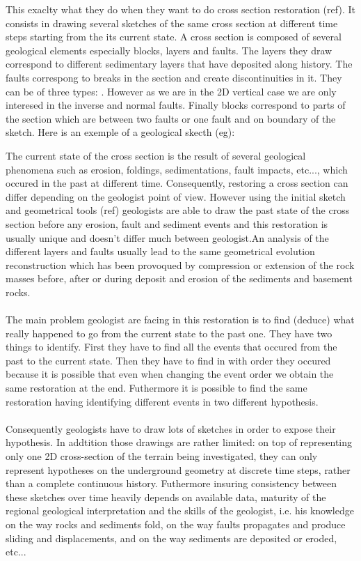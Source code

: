 \documentclass[12pt, a4paper]{memoir} %
\begin{document}
This exaclty what they do when they want to do cross section restoration (ref). It consists in drawing several sketches of the same cross section at different time steps starting from the its current state.  A cross section is composed of several geological elements especially blocks, layers and faults. The layers they draw correspond to different sedimentary layers that have deposited  along history. The faults correspong to breaks in the section and create discontinuities in it. They can be of three types:
. However as we are in the 2D vertical case we are only interesed in the inverse and normal faults. Finally blocks correspond to parts of the section which are between two faults or one fault and on boundary of the sketch. 
Here is an exemple of a geological skecth (eg): 


The current state of the cross section is the result of several geological phenomena such as erosion, foldings, sedimentations, fault impacts, etc..., which occured in the past at different time. Consequently, restoring a cross section can differ depending on the geologist point of view.
However using the initial sketch  and geometrical tools (ref) geologists are able to draw the past state of the cross section before any erosion, fault and sediment events and this restoration is usually unique and doesn't differ much between geologist.An analysis of the different layers and faults usually lead to the same geometrical evolution reconstruction which has been provoqued by compression or extension of the rock masses before, after or during deposit and erosion of the sediments and basement rocks. \\\\

The main problem geologist are facing in this restoration is to find (deduce) what really happened to go from the current state to the past one. They have two things to identify. First they have to find all the events that occured from the past to the current state. Then they have to find in with order they occured because it is possible that even when changing the event order we obtain the same restoration at the end. Futhermore it is possible to find the same restoration having identifying different events in two different hypothesis. \\\\

Consequently geologists have to draw lots of sketches in order to expose their hypothesis. In addtition those drawings are rather limited: on top of representing only one 2D cross-section of the terrain being investigated, they can only represent hypotheses on the underground geometry at discrete time steps, rather than a complete continuous history. Futhermore insuring consistency between these sketches over time heavily depends on available data, maturity of the regional geological interpretation and the skills of the geologist, i.e. his knowledge on the way rocks and sediments fold, on the way faults propagates and produce sliding and displacements, and on the way sediments are deposited or eroded, etc...\\\\
\end{document}
